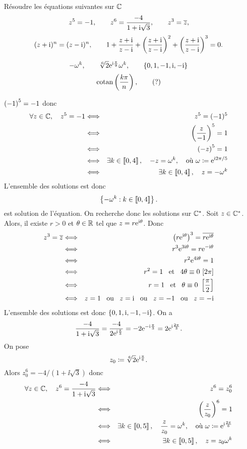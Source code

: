 \documentclass{magnolia}
\begin{document}
Résoudre les équations suivantes sur $\mathbb{C}$
$$z^5=-1, \qquad z^6=\frac{-4}{1+{\rm i}\sqrt{3}}, \qquad z^3=\overline{z},$$
$$(z+{\rm i})^n=(z-{\rm i})^n, \qquad
  1+\frac{z+{\rm i}}{z-{\rm i}}+\left(\frac{z+{\rm i}}{z-{\rm i}}\right)^2+\left(\frac{z+{\rm i}}{z-{\rm i}}\right)^3=0.$$
\begin{sol}
\[-\omega^k, \qquad \sqrt[6]{2}{\rm e}^{{\rm i}\frac{\pi}{9}}\omega^k, \qquad \left\{0,1,-1,{\rm i},-{\rm i}\right\}\]
\[\operatorname{cotan}\left(\frac{k\pi}{n}\right), \qquad (?)\] 
\begin{questions}
\question $\left(-1\right)^5=-1$ donc
  \begin{eqnarray*}
\forall z\in\mathbb{C},\quad z^5=-1
&\Longleftrightarrow& z^5=(-1)^5\\
&\Longleftrightarrow& \left(\frac{z}{-1}\right)^5=1\\
&\Longleftrightarrow& \left(-z\right)^5=1\\
&\Longleftrightarrow& \exists k\in\left\llbracket 0,4\right\rrbracket,\quad -z=\omega^k, \quad\text{où $\omega\coloneqq{\rm e}^{{\rm i} 2\pi/5}$}\\
&\Longleftrightarrow& \exists k\in\left\llbracket 0,4\right\rrbracket,\quad z=-\omega^k
\end{eqnarray*}
L'ensemble des solutions est donc
\[\left\{-\omega^k : k\in\left\llbracket 0,4\right\rrbracket\right\}.\]
 est solution de l'équation. On recherche donc les solutions sur $\mathbb{C}^*$. Soit $z\in\mathbb{C}^*$. Alors, il existe $r>0$ et $\theta\in\mathbb{R}$ tel que $z=r{\rm e}^{{\rm i}\theta}$. Donc
  \begin{eqnarray*}
z^3=\conj{z}
&\ssi& \p{r\e^{\ii\theta}}^3=\conj{r\e^{\ii\theta}}\\
&\ssi& r^3 \e^{3\ii\theta}=r\e^{-\ii\theta}\\
&\ssi& r^2 \e^{4\ii\theta}=1\\
&\ssi& r^2=1 \et 4\theta\equiv 0\ [2\pi]\\
&\ssi& r=1 \et \theta\equiv 0\ \cro{\frac{\pi}{2}}\\
&\ssi& z=1 \ou z=\ii \ou z=-1 \ou z=-\ii
  \end{eqnarray*}
L'ensemble des solutions est donc $\left\{0,1,{\rm i},-1,-{\rm i}\right\}$.
\question On a
  \[\frac{-4}{1+{\rm i}\sqrt{3}}=\frac{-4}{2{\rm e}^{{\rm i} \frac{\pi}{3}}}=-2{\rm e}^{-{\rm i}\frac{\pi}{3}}=2{\rm e}^{{\rm i}\frac{2\pi}{3}}.\]
  On pose
  \[z_0\coloneqq\sqrt[6]{2}{\rm e}^{{\rm i}\frac{\pi}{6}}.\]
  Alors $z_0^6=-4/(1+\ii\sqrt{3})$ donc
  \begin{eqnarray*}
  \forall z\in\C\qsep z^6=\frac{-4}{1+\ii\sqrt{3}}
  &\ssi& z^6 = z_0^6\\
  &\ssi& \p{\frac{z}{z_0}}^6 = 1\\
  &\ssi& \exists k\in\intere{0}{5}\qsep \frac{z}{z_0}=\omega^k, \quad\text{où $\omega\defeq\e^{\ii\frac{2\pi}{6}}$}\\
&\ssi& \exists k\in\intere{0}{5}\qsep z=z_0 \omega^k

\end{eqnarray*}
\end{questions}
\end{sol}
\end{document}
